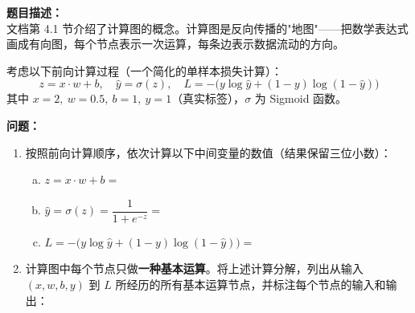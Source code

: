 \documentclass[a4paper,11pt]{ctexart}
\begin{document}
\begin{problembox}
    \textbf{题目描述：}\\
    文档第 4.1 节介绍了计算图的概念。计算图是反向传播的"地图"——把数学表达式画成有向图，每个节点表示一次运算，每条边表示数据流动的方向。

    \vspace{0.3cm}
    考虑以下前向计算过程（一个简化的单样本损失计算）：
    \[
    z = x \cdot w + b, \quad \hat{y} = \sigma(z), \quad L = -\bigl(y \log \hat{y} + (1-y)\log(1-\hat{y})\bigr)
    \]
    其中 $x=2,\ w=0.5,\ b=1,\ y=1$（真实标签），$\sigma$ 为 Sigmoid 函数。

    \vspace{0.3cm}
    \textbf{问题：}
    \begin{enumerate}[(1)]
        \item 按照前向计算顺序，依次计算以下中间变量的数值（结果保留三位小数）：
        \begin{enumerate}[a.]
            \item $z = x \cdot w + b = $\underline{\hspace{4cm}}
            \item $\hat{y} = \sigma(z) = \dfrac{1}{1+e^{-z}} = $\underline{\hspace{3.5cm}}
            \item $L = -\bigl(y\log\hat{y} + (1-y)\log(1-\hat{y})\bigr) = $\underline{\hspace{3cm}}
        \end{enumerate}

        \item 计算图中每个节点只做\textbf{一种基本运算}。将上述计算分解，列出从输入 $(x, w, b, y)$ 到 $L$ 所经历的所有基本运算节点，并标注每个节点的输入和输出：


\end{enumerate}
\end{problembox}
\end{document}
